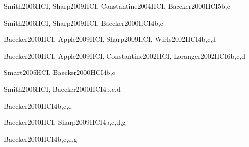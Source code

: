 \begin{syllabus}

\begin{unit}{\HCUserCenteredSoftwareDevelopmentDef}{Smith2006HCI, Sharp2009HCI, Constantine2004HCI, Baecker2000HCI}{5}{b,c}
    \HCUserCenteredSoftwareDevelopmentAllTopics
    \HCUserCenteredSoftwareDevelopmentAllObjectives
\end{unit}

\begin{unit}{\HCUserCenteredSoftwareEvaluationDef}{Smith2006HCI, Sharp2009HCI, Baecker2000HCI}{4}{b,c}
    \HCUserCenteredSoftwareEvaluationAllTopics
    \HCUserCenteredSoftwareEvaluationAllObjectives
\end{unit}

\begin{unit}{\HCGUIDesignDef}{Baecker2000HCI, Apple2009HCI, Sharp2009HCI, Wirfs2002HCI}{4}{b,c,d}
    \HCGUIDesignAllTopics
    \HCGUIDesignAllObjectives
\end{unit}

\begin{unit}{\HCBuildingGUIInterfacesDef}{Baecker2000HCI, Apple2009HCI, Constantine2002HCI, Loranger2002HCI}{6}{b,c,d}
    \HCBuildingGUIInterfacesAllTopics
    \HCBuildingGUIInterfacesAllObjectives
\end{unit}

\begin{unit}{\HCGUIProgrammingDef}{Smart2005HCI, Baecker2000HCI}{4}{b,c}
    \HCGUIProgrammingAllTopics
    \HCGUIProgrammingAllObjectives
\end{unit}

\begin{unit}{\HCMultimediaAndMultimodalSystemsDef}{Smith2006HCI, Baecker2000HCI}{4}{b,c,d}
    \HCMultimediaAndMultimodalSystemsAllTopics
    \HCMultimediaAndMultimodalSystemsAllObjectives
\end{unit}

\begin{unit}{\HCCollaborationAndCommunicationDef}{Baecker2000HCI}{4}{b,c,d}
    \HCCollaborationAndCommunicationAllTopics
    \HCCollaborationAndCommunicationAllObjectives
\end{unit}

\begin{unit}{\HCInteractionDesignForNewEnvironmentsDef}{Baecker2000HCI, Sharp2009HCI}{4}{b,c,d,g}
    \HCInteractionDesignForNewEnvironmentsAllTopics
    \HCInteractionDesignForNewEnvironmentsAllObjectives
\end{unit}

\begin{unit}{\HCHumanFactorsAndSecurityDef}{Baecker2000HCI}{4}{b,c,d,g}
    \HCHumanFactorsAndSecurityAllTopics
    \HCHumanFactorsAndSecurityAllObjectives
\end{unit}



\begin{coursebibliography}
\end{coursebibliography}
\end{syllabus}
